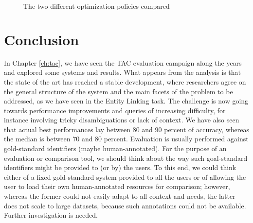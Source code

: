 \documentclass[a4paper,11pt]{report}
\begin{document}
\begin{figure}[htbp]

\caption{The two different optimization policies compared}

\end{figure}

\chapter{Conclusion}
In Chapter \ref{ch:tac}, we have seen the TAC evaluation campaign along the years and explored some systems and results. What appears from the analysis is that the state of the art has reached a stable development, where researchers agree on the general structure of the system and the main facets of the problem to be addressed, as we have seen in the Entity Linking task. The challenge is now going towards performance improvements and queries of increasing difficulty, for instance involving tricky disambiguations or lack of context.
We have also seen that actual best performances lay between 80 and 90 percent of accuracy, whereas the median is between 70 and 80 percent. %
Evaluation is usually performed against gold-standard identifiers (maybe human-annotated).  For the purpose of an evaluation or comparison tool, we should think about the way such goal-standard identifiers might be provided to (or by) the users. To this end, we could think either of a fixed gold-standard system provided to all the users or of allowing the user to load their own human-annotated resources for comparison; however, whereas the former could not easily adapt to all context and needs, the latter does not scale to large datasets, because such annotations could not be available. Further investigation is needed.
\end{document}
